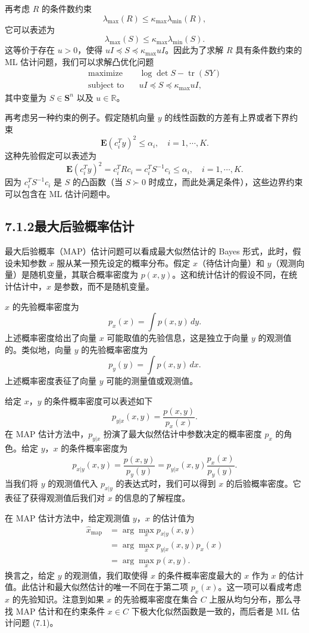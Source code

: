 \documentclass[UTF8, 12pt, fontset=fandol, oneside]{ctexart}
\begin{document}
再考虑 $R$ 的条件数约束
\[
\lambda_{\max}(R)\leq \kappa_{\max}\lambda_{\min}(R),
\]
它可以表述为
\[
\lambda_{\max}(S)\leq \kappa_{\max}\lambda_{\min}(S).
\]
这等价于存在 $u>0$，使得 $uI\preceq S\preceq \kappa_{\max}uI$。因此为了求解 $R$ 具有条件数约束的 ML 估计问题，我们可以求解凸优化问题
\begin{equation}
\begin{aligned}
\text{maximize}\quad & \log\det S-\operatorname{tr}(SY)\\
\text{subject to}\quad & uI\preceq S\preceq \kappa_{\max}uI,
\end{aligned}
\tag{7.5}
\end{equation}
其中变量为 $S\in\mathbf{S}^n$ 以及 $u\in\mathbb{R}$。

再考虑另一种约束的例子。假定随机向量 $y$ 的线性函数的方差有上界或者下界约束
\[
\mathbf{E}(c_i^T y)^2\leq \alpha_i,\quad i=1,\cdots,K.
\]
这种先验假定可以表述为
\[
\mathbf{E}(c_i^T y)^2=c_i^TRc_i=c_i^TS^{-1}c_i\leq \alpha_i,\quad i=1,\cdots,K.
\]
因为 $c_i^TS^{-1}c_i$ 是 $S$ 的凸函数（当 $S\succ 0$ 时成立，而此处满足条件），这些边界约束可以包含在 ML 估计问题中。

\subsection*{7.1.2\quad 最大后验概率估计}

最大后验概率（MAP）估计问题可以看成最大似然估计的 Bayes 形式，此时，假设未知参数 $x$ 服从某一预先设定的概率分布。假定 $x$（待估计向量）和 $y$（观测向量）是随机变量，其联合概率密度为 $p(x,y)$。这和统计估计的假设不同，在统计估计中，$x$ 是参数，而不是随机变量。

$x$ 的先验概率密度为
\[
p_x(x)=\int p(x,y)\,dy.
\]
上述概率密度给出了向量 $x$ 可能取值的先验信息，这是独立于向量 $y$ 的观测值的。类似地，向量 $y$ 的先验概率密度为
\[
p_y(y)=\int p(x,y)\,dx.
\]
上述概率密度表征了向量 $y$ 可能的测量值或观测值。

给定 $x$，$y$ 的条件概率密度可以表述如下
\[
p_{y|x}(x,y)=\frac{p(x,y)}{p_x(x)}.
\]
在 MAP 估计方法中，$p_{y|x}$ 扮演了最大似然估计中参数决定的概率密度 $p_x$ 的角色。给定 $y$，$x$ 的条件概率密度为
\[
p_{x|y}(x,y)=\frac{p(x,y)}{p_y(y)}=p_{y|x}(x,y)\frac{p_x(x)}{p_y(y)}.
\]
当我们将 $y$ 的观测值代入 $p_{x|y}$ 的表达式时，我们可以得到 $x$ 的后验概率密度。它表征了获得观测值后我们对 $x$ 的信息的了解程度。

在 MAP 估计方法中，给定观测值 $y$，$x$ 的估计值为
\[
\begin{aligned}
\hat{x}_{\mathrm{map}}
&=\arg\max_x p_{x|y}(x,y)\\
&=\arg\max_x p_{y|x}(x,y)p_x(x)\\
&=\arg\max_x p(x,y).
\end{aligned}
\]
换言之，给定 $y$ 的观测值，我们取使得 $x$ 的条件概率密度最大的 $x$ 作为 $x$ 的估计值。此估计和最大似然估计的唯一不同在于第二项 $p_x(x)$。这一项可以看成考虑 $x$ 的先验知识。注意到如果 $x$ 的先验概率密度在集合 $C$ 上服从均匀分布，那么寻找 MAP 估计和在约束条件 $x\in C$ 下极大化似然函数是一致的，而后者是 ML 估计问题 (7.1)。
\end{document}
